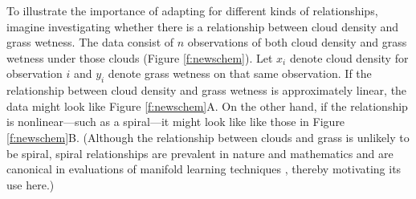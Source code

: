 \documentclass[11pt]{article}
\begin{document}
To illustrate the importance of adapting for different kinds of relationships, 
imagine investigating whether there is a relationship between cloud density and grass wetness. The data consist of $n$ observations of both cloud density and grass wetness under those clouds (Figure \ref{f:newschem}).
Let $x_i$ denote cloud density for observation $i$ and $y_i$ denote grass wetness on that same observation. 
If the relationship between cloud density and grass wetness is approximately linear, the data might look like Figure \ref{f:newschem}{\color{magenta}A}. 
On the other hand, if the relationship is nonlinear---such as a  spiral---it might look like
like those in Figure \ref{f:newschem}{\color{magenta}B}.
(Although the relationship between clouds and grass is unlikely to be spiral, spiral relationships are prevalent in nature and mathematics and are canonical in evaluations of manifold learning techniques \cite{Lee07a}, thereby motivating its use here.)
\end{document}
